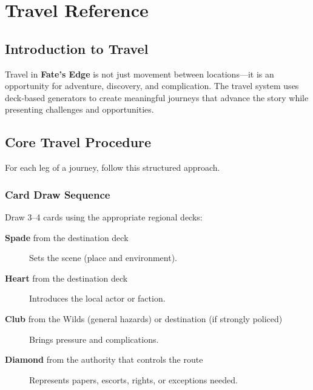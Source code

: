 
\chapter{Travel Reference}\label{chap:travel_reference}

\section{Introduction to Travel}\label{sec:travel_intro}

Travel in \textbf{Fate's Edge} is not just movement between locations---it is an opportunity for adventure, discovery, and complication. The travel system uses deck‑based generators to create meaningful journeys that advance the story while presenting challenges and opportunities.

\section{Core Travel Procedure}\label{sec:core_travel}

For each leg of a journey, follow this structured approach.

\subsection{Card Draw Sequence}\label{subsec:card_draw}

Draw 3--4 cards using the appropriate regional decks:

\begin{description}
    \item[\textbf{Spade} from the destination deck] Sets the scene (place and environment).
    \item[\textbf{Heart} from the destination deck] Introduces the local actor or faction.
    \item[\textbf{Club} from the Wilds (general hazards) or destination (if strongly policed)] Brings pressure and complications.
    \item[\textbf{Diamond} from the authority that controls the route] Represents papers, escorts, rights, or exceptions needed.
\end{description}

